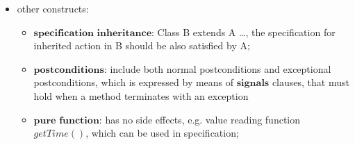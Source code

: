 \begin{itemize}
  \item other constructs: 
    \begin{itemize}
      \item $\textbf{specification inheritance}$: Class B extends A {\ldots},
      the specification for inherited action in B should be also satisfied by A;
      \item $\textbf{postconditions}$: include both normal postconditions and
      exceptional postconditions, which is expressed by means of
      $\textbf{signals}$ clauses, that must hold when a method terminates with
      an exception
      \item $\textbf{pure function}$: has no side effects, e.g. value reading
      function $\mathit{getTime()}$, which can be used in specification;
    \end{itemize}
\end{itemize}